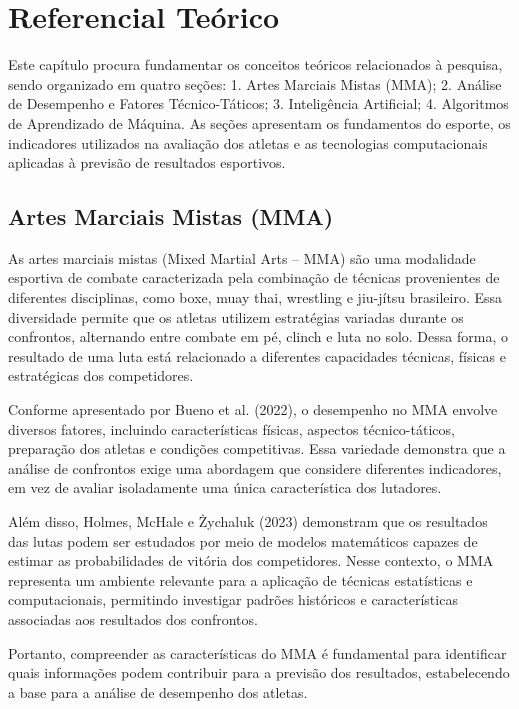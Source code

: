 \documentclass[12pt,a4paper]{report}
\begin{document}
\chapter{Referencial Teórico}

Este capítulo procura fundamentar os conceitos teóricos relacionados à pesquisa, sendo organizado em quatro seções: 1. Artes Marciais Mistas (MMA); 2. Análise de Desempenho e Fatores Técnico-Táticos; 3. Inteligência Artificial; 4. Algoritmos de Aprendizado de Máquina. As seções apresentam os fundamentos do esporte, os indicadores utilizados na avaliação dos atletas e as tecnologias computacionais aplicadas à previsão de resultados esportivos.

\section{Artes Marciais Mistas (MMA)}

As artes marciais mistas (Mixed Martial Arts -- MMA) são uma modalidade esportiva de combate caracterizada pela combinação de técnicas provenientes de diferentes disciplinas, como boxe, muay thai, wrestling e jiu-jítsu brasileiro. Essa diversidade permite que os atletas utilizem estratégias variadas durante os confrontos, alternando entre combate em pé, clinch e luta no solo. Dessa forma, o resultado de uma luta está relacionado a diferentes capacidades técnicas, físicas e estratégicas dos competidores.

Conforme apresentado por Bueno et al. (2022), o desempenho no MMA envolve diversos fatores, incluindo características físicas, aspectos técnico-táticos, preparação dos atletas e condições competitivas. Essa variedade demonstra que a análise de confrontos exige uma abordagem que considere diferentes indicadores, em vez de avaliar isoladamente uma única característica dos lutadores.

Além disso, Holmes, McHale e Żychaluk (2023) demonstram que os resultados das lutas podem ser estudados por meio de modelos matemáticos capazes de estimar as probabilidades de vitória dos competidores. Nesse contexto, o MMA representa um ambiente relevante para a aplicação de técnicas estatísticas e computacionais, permitindo investigar padrões históricos e características associadas aos resultados dos confrontos.

Portanto, compreender as características do MMA é fundamental para identificar quais informações podem contribuir para a previsão dos resultados, estabelecendo a base para a análise de desempenho dos atletas.
\end{document}
